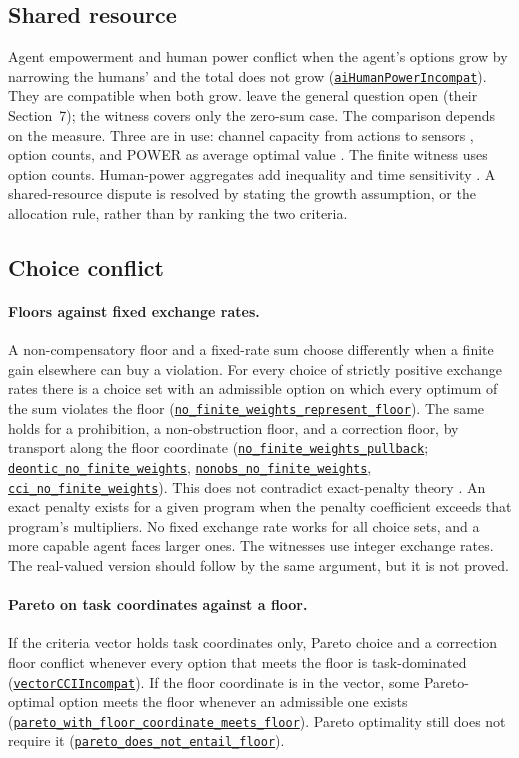 \documentclass[11pt]{article}
\newcommand{\lean}[1]{\hyperref[lean:#1]{\nolinkurl{#1}}}
\begin{document}
\subsection{Shared resource}
\label{sec:shared}

Agent empowerment and human power conflict when the agent's options grow by narrowing the humans' and the total does not grow (\lean{aiHumanPowerIncompat}).
They are compatible when both grow.
\textcite{turner2021seekpower} leave the general question open (their Section~7); the witness covers only the zero-sum case.
The comparison depends on the measure.
Three are in use: channel capacity from actions to sensors \parencite{klyubin2005empowerment}, option counts, and POWER as average optimal value \parencite{turner2021seekpower}.
The finite witness uses option counts.
Human-power aggregates add inequality and time sensitivity \parencite{heitzig2025humanpower}.
A shared-resource dispute is resolved by stating the growth assumption, or the allocation rule, rather than by ranking the two criteria.

\subsection{Choice conflict}
\label{sec:choice}

\paragraph{Floors against fixed exchange rates.}
A non-compensatory floor and a fixed-rate sum choose differently when a finite gain elsewhere can buy a violation.
For every choice of strictly positive exchange rates there is a choice set with an admissible option on which every optimum of the sum violates the floor (\lean{no_finite_weights_represent_floor}).
The same holds for a prohibition, a non-obstruction floor, and a correction floor, by transport along the floor coordinate (\lean{no_finite_weights_pullback}; \lean{deontic_no_finite_weights}, \lean{nonobs_no_finite_weights}, \lean{cci_no_finite_weights}).
This does not contradict exact-penalty theory \parencite{han1979exact}.
An exact penalty exists for a given program when the penalty coefficient exceeds that program's multipliers.
No fixed exchange rate works for all choice sets, and a more capable agent faces larger ones.
The witnesses use integer exchange rates.
The real-valued version should follow by the same argument, but it is not proved.

\paragraph{Pareto on task coordinates against a floor.}
If the criteria vector holds task coordinates only, Pareto choice and a correction floor conflict whenever every option that meets the floor is task-dominated (\lean{vectorCCIIncompat}).
If the floor coordinate is in the vector, some Pareto-optimal option meets the floor whenever an admissible one exists (\lean{pareto_with_floor_coordinate_meets_floor}).
Pareto optimality still does not require it (\lean{pareto_does_not_entail_floor}).
\end{document}
